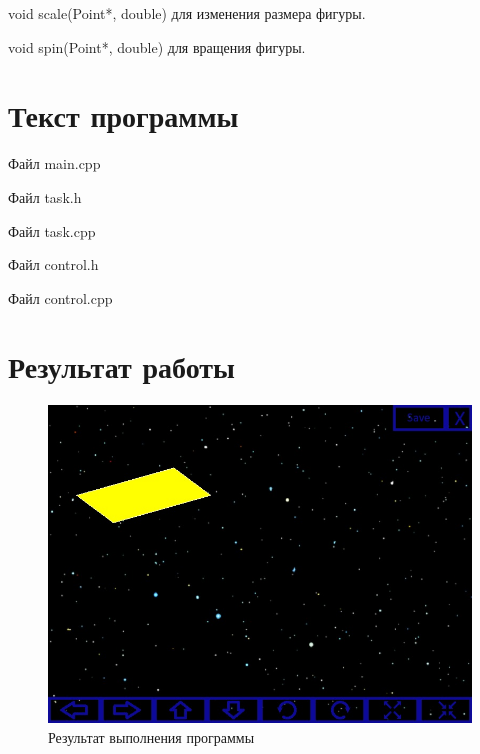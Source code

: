 \documentclass[14pt, a4paper]{extreport}
\begin{document}
void scale(Point*, double) для изменения размера фигуры.

void spin(Point*, double) для вращения фигуры.

\chapter{Текст программы}

\noindent Файл main.cpp

\pagebreak
\hrulefill

\noindent Файл task.h

\hrulefill

\noindent Файл task.cpp

\hrulefill

\noindent Файл control.h

\hrulefill

\noindent Файл control.cpp


\chapter{Результат работы}

\begin{figure}[h!]
	\centering
	\includegraphics[width = 12cm]{image/output}
  \caption{Результат выполнения программы}
\end{figure}


\end{document}
